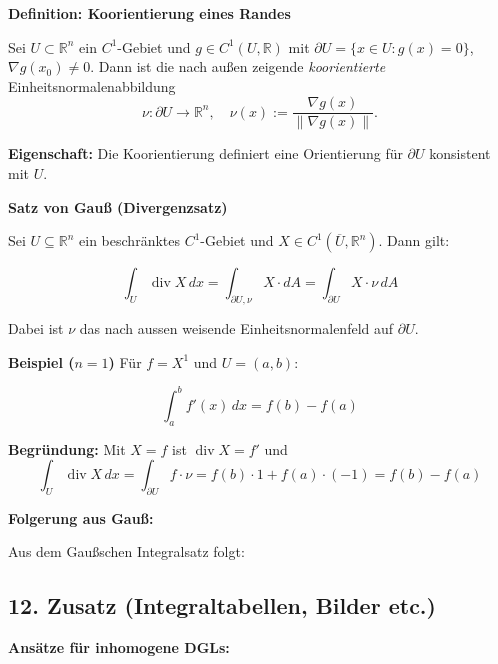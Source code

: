 \textbf{Definition: Koorientierung eines Randes}

Sei $U \subset \mathbb{R}^n$ ein $C^1$-Gebiet und $g \in C^1(U, \mathbb{R})$ mit $\partial U = \{x \in U : g(x) = 0\}$, $\nabla g(x_0) \neq 0$.  
Dann ist die nach außen zeigende \textit{koorientierte} Einheitsnormalenabbildung
\[
\nu: \partial U \to \mathbb{R}^n, \quad \nu(x) := \frac{\nabla g(x)}{\|\nabla g(x)\|}.
\]

\textbf{Eigenschaft:}  
Die Koorientierung definiert eine Orientierung für $\partial U$ konsistent mit $U$.

\textbf{Satz von Gauß (Divergenzsatz)}

Sei $U \subseteq \mathbb{R}^n$ ein beschränktes $C^1$-Gebiet und $X \in C^1(\overline{U}, \mathbb{R}^n)$. Dann gilt:

\[
\int_U \operatorname{div} X \, dx = \int_{\partial U, \nu} X \cdot dA = \int_{\partial U} X \cdot \nu \, dA
\]

Dabei ist $\nu$ das nach aussen weisende Einheitsnormalenfeld auf $\partial U$.

\textbf{Beispiel ($n=1$)}
Für $f = X^1$ und $U = (a,b)$:

\[
\int_a^b f'(x)\, dx = f(b) - f(a)
\]

\textbf{Begründung:} Mit $X = f$ ist $\operatorname{div} X = f'$ und
\[
\int_U \operatorname{div} X \, dx = \int_{\partial U} f \cdot \nu = f(b)\cdot 1 + f(a)\cdot (-1) = f(b) - f(a)
\]

\textbf{Folgerung aus Gauß:}

Aus dem Gaußschen Integralsatz folgt:


\subsection{12. Zusatz (Integraltabellen, Bilder etc.)}

\textbf{Ansätze für inhomogene DGLs:}

